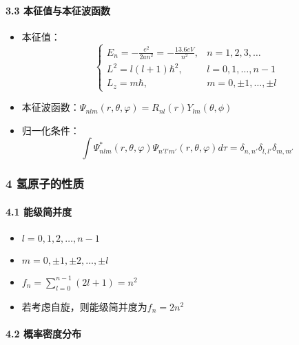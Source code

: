 \documentclass[UTF8,twocolumn]{ctexart}
\providecommand{\tightlist}{%
  \setlength{\itemsep}{0pt}\setlength{\parskip}{0pt}}
\let\oldparagraph\paragraph
\renewcommand{\paragraph}[1]{\oldparagraph{#1}\mbox{}}
\begin{document}
\hypertarget{ux672cux5f81ux503cux4e0eux672cux5f81ux6ce2ux51fdux6570}{%
\paragraph{ 3.3
本征值与本征波函数}\label{ux672cux5f81ux503cux4e0eux672cux5f81ux6ce2ux51fdux6570}}

\begin{itemize}
\tightlist
\item
  本征值： \[\begin{cases}
  E_n=-\frac{e^2}{2an^2}=-\frac{13.6eV}{n^2}, & n=1,2,3,\ldots\\
  L^2=l(l+1)\hbar^2, & l=0,1,\ldots,n-1\\
  L_z=m\hbar, & m=0,\pm1,\ldots,\pm l
  \end{cases}\]
\item
  本征波函数：\(\Psi_{nlm}(r,\theta,\varphi)=R_{nl}(r)Y_{lm}(\theta,\phi)\)
\item
  归一化条件：
  $$\int\Psi_{nlm}^*(r,\theta,\varphi)\Psi_{n'l'm'}(r,\theta,\varphi)d\tau=\delta_{n,n'}\delta_{l,l'}\delta_{m,m'}$$
\end{itemize}

\hypertarget{ux6c22ux539fux5b50ux7684ux6027ux8d28}{%
\subsubsection{4
氢原子的性质}\label{ux6c22ux539fux5b50ux7684ux6027ux8d28}}

\hypertarget{ux80fdux7ea7ux7b80ux5e76ux5ea6}{%
\paragraph{ 4.1 能级简并度}\label{ux80fdux7ea7ux7b80ux5e76ux5ea6}}

\begin{itemize}
\tightlist
\item
  \(l=0,1,2,\ldots,n-1\)
\item
  \(m=0,\pm1,\pm2,\ldots,\pm l\)
\item
  \(f_n=\sum_{l=0}^{n-1}(2l+1)=n^2\)
\item
  若考虑自旋，则能级简并度为\(f_n=2n^2\)
\end{itemize}

\hypertarget{ux6982ux7387ux5bc6ux5ea6ux5206ux5e03}{%
\paragraph{ 4.2
概率密度分布}\label{ux6982ux7387ux5bc6ux5ea6ux5206ux5e03}}
\end{document}
